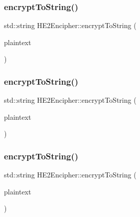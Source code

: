 \subsubsection{\texorpdfstring{encrypt\+To\+String()}{encryptToString()}\hspace{0.1cm}{\footnotesize\ttfamily [2/4]}}
{\footnotesize\ttfamily std\+::string H\+E2\+Encipher\+::encrypt\+To\+String (\begin{DoxyParamCaption}\item[{int32\+\_\+t}]{plaintext }\end{DoxyParamCaption})\hspace{0.3cm}{\ttfamily [virtual]}}

\mbox{\label{classHE2Encipher_a3c4dfca45e9f65955e64a328910b1339}} 
\subsubsection{\texorpdfstring{encrypt\+To\+String()}{encryptToString()}\hspace{0.1cm}{\footnotesize\ttfamily [3/4]}}
{\footnotesize\ttfamily std\+::string H\+E2\+Encipher\+::encrypt\+To\+String (\begin{DoxyParamCaption}\item[{int64\+\_\+t}]{plaintext }\end{DoxyParamCaption})\hspace{0.3cm}{\ttfamily [virtual]}}

\mbox{\label{classHE2Encipher_a2b0d3c50f377d3cabe1a102f55ae2b48}} 
\subsubsection{\texorpdfstring{encrypt\+To\+String()}{encryptToString()}\hspace{0.1cm}{\footnotesize\ttfamily [4/4]}}
{\footnotesize\ttfamily std\+::string H\+E2\+Encipher\+::encrypt\+To\+String (\begin{DoxyParamCaption}\item[{N\+T\+L\+::\+ZZ \&}]{plaintext }\end{DoxyParamCaption})\hspace{0.3cm}{\ttfamily [virtual]}}

